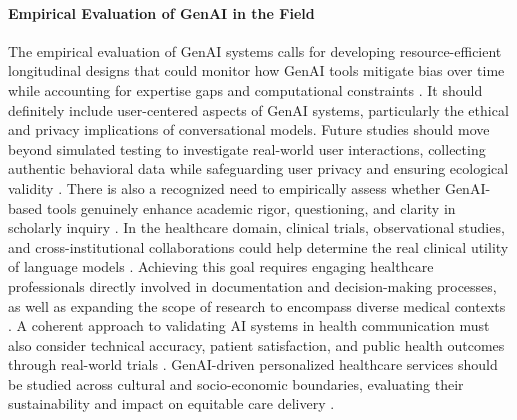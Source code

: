 \paragraph{Empirical Evaluation of GenAI in the Field}
The empirical evaluation of GenAI systems calls for developing resource-efficient longitudinal designs that could monitor how GenAI tools mitigate bias over time while accounting for expertise gaps and computational constraints \parencite{R01}. 
It should definitely include user-centered aspects of GenAI systems, particularly the ethical and privacy implications of conversational models. Future studies should move beyond simulated testing to investigate real-world user interactions, collecting authentic behavioral data while safeguarding user privacy and ensuring ecological validity \parencite{S08}. 
There is also a recognized need to empirically assess whether GenAI-based tools genuinely enhance academic rigor, questioning, and clarity in scholarly inquiry \parencite{R06}. 
In the healthcare domain, clinical trials, observational studies, and cross-institutional collaborations could help determine the real clinical utility of language models \parencite{S01}. Achieving this goal requires engaging healthcare professionals directly involved in documentation and decision-making processes, as well as expanding the scope of research to encompass diverse medical contexts \parencite{S05}. A coherent approach to validating AI systems in health communication must also consider technical accuracy, patient satisfaction, and public health outcomes through real-world trials \parencite{S11}. 
GenAI-driven personalized healthcare services should be studied across cultural and socio-economic boundaries, evaluating their sustainability and impact on equitable care delivery \parencite{S17}. 

